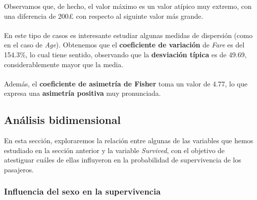 \documentclass{article}
\begin{document}
\noindent Observamos que, de hecho, el valor máximo es un valor atípico muy extremo, con una diferencia de 200£ con respecto al siguinte valor más grande.\\\\
En este tipo de casos es interesante estudiar algunas medidas de dispersión (como en el caso de \textit{Age}). Obtenemos que el \textbf{coeficiente de variación} de \textit{Fare} es del 154.3\%, lo cual tiene sentido, observando que la \textbf{desviación típica} es de 49.69, considerablemente mayor que la media.\\\\
Además, el \textbf{coeficiente de asimetría de Fisher} toma un valor de 4.77, lo que expresa una \textbf{asimetría positiva} muy pronunciada.

\newpage

\subsection{Análisis bidimensional}

En esta sección, exploraremos la relación entre algunas de las variables que hemos estudiado en la sección anterior y la variable \textit{Survived}, con el objetivo de atestiguar cuáles de ellas influyeron en la probabilidad de supervivencia de los pasajeros. 

\subsubsection{Influencia del sexo en la supervivencia}
\end{document}
